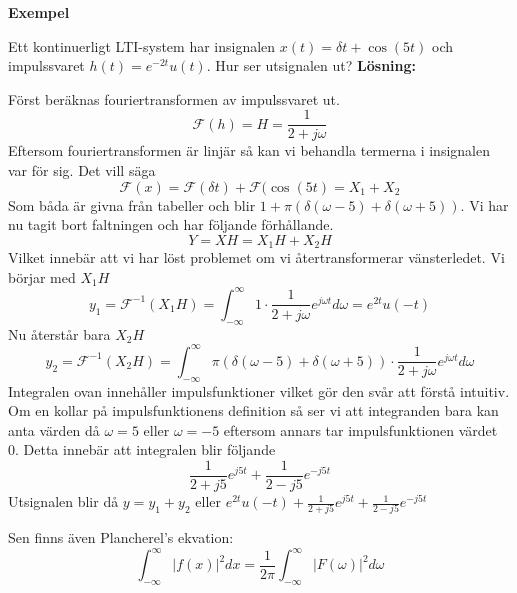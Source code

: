 \documentclass{article}
\begin{document}
\textbf{Exempel} %

Ett kontinuerligt LTI-system har insignalen $x(t)=\delta{t} + \cos(5 t)$ och impulssvaret $h(t) = e^{-2 t} u(t)$. Hur ser utsignalen ut?
\textbf{Lösning:}

Först beräknas fouriertransformen av impulssvaret ut. 
\[\mathcal{F}(h) = H = \frac{1}{2+j \omega}\]
Eftersom fouriertransformen är linjär så kan vi behandla termerna i insignalen var för sig. Det vill säga 
\[\mathcal{F} (x) = \mathcal{F}(\delta{t}) + \mathcal{F}(\cos(5 t) = X_1 + X_2 \]
Som båda är givna från tabeller och blir $1+\pi(\delta(\omega - 5) + \delta(\omega + 5))$. Vi har nu tagit bort faltningen och har följande förhållande.
\[Y = X H = X_1 H + X_2 H\]
Vilket innebär att vi har löst problemet om vi återtransformerar vänsterledet. Vi börjar med $X_1 H$
\[y_1=\mathcal{F}^{-1}(X_1 H) =  \int_{-\infty}^{\infty} 1 \cdot \frac{1}{2+j \omega} e^{j \omega t} d\omega = e^{2 t} u(-t)\]
Nu återstår bara $X_2 H$
\[y_2=\mathcal{F}^{-1}(X_2 H) = \int_{-\infty}^{\infty} \pi(\delta(\omega - 5) + \delta(\omega + 5)) \cdot \frac{1}{2+j \omega} e^{j \omega t} d\omega \]
Integralen ovan innehåller impulsfunktioner vilket gör den svår att förstå intuitiv. Om en kollar på impulsfunktionens definition så ser vi att integranden bara kan anta värden då $\omega=5$ eller $\omega =-5$ eftersom annars tar impulsfunktionen värdet 0. Detta innebär att integralen blir följande
$$\frac{1}{2+j 5} e^{j 5 t} + \frac{1}{2-j 5} e^{-j 5 t}$$ %
Utsignalen blir då $y=y_1 + y_2$ eller $e^{2 t} u(-t) + \frac{1}{2+j 5} e^{j 5 t} + \frac{1}{2-j 5} e^{-j 5 t}$

Sen finns även Plancherel's ekvation: %
\[\int_{-\infty}^{\infty} |f(x)|^2 dx = \frac{1}{2 \pi}\int_{-\infty}^{\infty} |F(\omega)|^2 d\omega \] %
\end{document}
